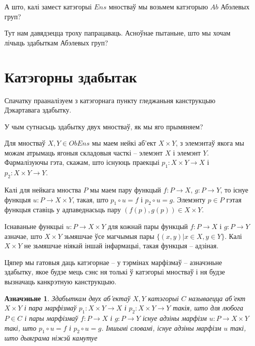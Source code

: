 \documentclass[a4paper,12pt]{book}
\newtheorem{definition}{Азначэньне}[section]
\begin{document}
А што, калі замест катэгорыі $Ens$ мностваў мы возьмем катэгорыю
$Ab$ Абэлевых груп?

Тут нам давядзецца троху папрацаваць. Асноўнае пытаньне, што мы хочам
лічыць здабыткам Абэлевых груп?

\section{Катэгорны здабытак}

Спачатку прааналізуем з катэгорнага пункту гледжаньня канструкцыю
Дэкартавага здабытку.

У чым сутнасьць здабытку двух мностваў, як мы яго прымяняем?

Для
мностваў $X, Y \in Ob Ens$ мы маем нейкі аб'ект $X \times Y$, з
элемэнтаў якога мы можам атрымаць ягоныя складовыя часткі -- элемэнт
$X$ і элемэнт $Y$. Фармалізуючы гэта, скажам, што існуюць праекцыі
$p_1: X \times Y \rightarrow X$ і $p_2: X \times Y \rightarrow Y$.

Калі для нейкага мноства $P$ мы маем пару функцый
$f: P \rightarrow X$, $g: P \rightarrow Y$, то існуе функцыя $u: P
\rightarrow X \times Y$, такая, што $p_1 \circ u = f$ і $p_2 \circ u =
g$. Элемэнту $p \in P$ гэтая функцыя ставіць у адпаведнасьць пару
$(f(p), g(p)) \in X \times Y$.

Існаваньне функцыі $u: P \rightarrow X \times Y$ для кожнай пары
функцый $f: P \rightarrow X$ і $g: P \rightarrow Y$ азначае, што $X
\times Y$ зьмяшчае ўсе магчымыя пары $\{(x, y) | x \in X, y \in
Y\}$. Калі $X \times Y$ не зьмяшчае ніякай іншай інфармацыі, такая
функцыя -- адзіная.

Цяпер мы гатовыя даць катэгорнае -- у тэрмінах марфізмаў -- азначэньне
здабытку, якое будзе мець сэнс ня толькі ў катэгорыі мностваў і ня
будзе вызначаць канкрэтную канструкцыю.

\begin{definition}
  Здабыткам двух аб'ектаў $X, Y$ катэгорыі $C$ называецца аб'ект $X
  \times Y$ і пара марфізмаў $p_1: X \times Y \rightarrow X$ і $p_2: X
  \times Y \rightarrow Y$ такія, што для любога $P \in C$ і пары
  марфізмаў $f: P \rightarrow X$ і $g: P \rightarrow Y$ існуе адзіны
  марфізм $u:P \rightarrow X \times Y$ такі, што $p_1 \circ u = f$ і
  $p_2 \circ u = g$. Іншымі словамі, існуе адзіны марфізм $u$ такі,
  што дыяграма ніжэй камутуе

\end{definition}
\end{document}
